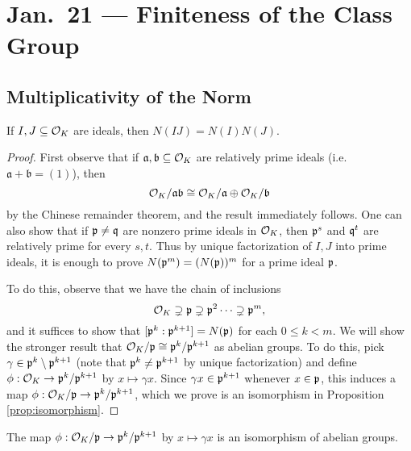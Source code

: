 \chapter{Jan.~21 --- Finiteness of the Class Group}

\section{Multiplicativity of the Norm}

\begin{theorem}
  If $I, J \subseteq \mathcal{O}_K$ are ideals, then
  $N(IJ) = N(I) N(J)$.
\end{theorem}

\begin{proof}
  First observe that if $\mathfrak{a}, \mathfrak{b} \subseteq \mathcal{O}_K$ are
  relatively prime ideals (i.e. $\mathfrak{a} + \mathfrak{b} = (1)$), then
  \[
    \mathcal{O}_K / \mathfrak{a} \mathfrak{b} \cong \mathcal{O}_K / \mathfrak{a} \oplus \mathcal{O}_K / \mathfrak{b}
  \]
  by the Chinese remainder theorem, and
  the result immediately follows. One can also
  show that if $\mathfrak{p} \ne \mathfrak{q}$ are nonzero prime ideals in
  $\mathcal{O}_K$, then
  $\mathfrak{p}^s$ and $\mathfrak{q}^t$ are relatively prime for every
  $s, t$. Thus by unique factorization of $I, J$ into
  prime ideals,
  it is enough to prove $N(\mathfrak{p}^m) = (N(\mathfrak{p}))^m$
  for a prime ideal $\mathfrak{p}$.

  To do this, observe that we have the chain of inclusions
  \[
    \mathcal{O}_K \supsetneq \mathfrak{p} \supsetneq \mathfrak{p}^2 \dots \supsetneq \mathfrak{p}^m,
  \]
  and it suffices to show that $[\mathfrak{p}^k : \mathfrak{p}^{k + 1}] = N(\mathfrak{p})$
  for each $0 \le k < m$. We will show the
  stronger result that $\mathcal{O}_K / \mathfrak{p} \cong \mathfrak{p}^k / \mathfrak{p}^{k + 1}$
  as abelian groups. To do this, pick
  $\gamma \in \mathfrak{p}^k \setminus \mathfrak{p}^{k + 1}$ (note
  that $\mathfrak{p}^k \ne \mathfrak{p}^{k + 1}$ by unique factorization)
  and define $\phi : \mathcal{O}_K \to \mathfrak{p}^k / \mathfrak{p}^{k + 1}$
  by $x \mapsto \gamma x$. Since $\gamma x \in \mathfrak{p}^{k + 1}$
  whenever $x \in \mathfrak{p}$, this induces a map
  $\phi : \mathcal{O}_K / \mathfrak{p} \to \mathfrak{p}^k / \mathfrak{p}^{k + 1}$, which
  we prove is an isomorphism in Proposition
  \ref{prop:isomorphism}.
\end{proof}

\begin{prop}\label{prop:isomorphism}
  The map $\phi : \mathcal{O}_K / \mathfrak{p} \to \mathfrak{p}^k / \mathfrak{p}^{k + 1}$
  by $x \mapsto \gamma x$ is an isomorphism
  of abelian groups.
\end{prop}

